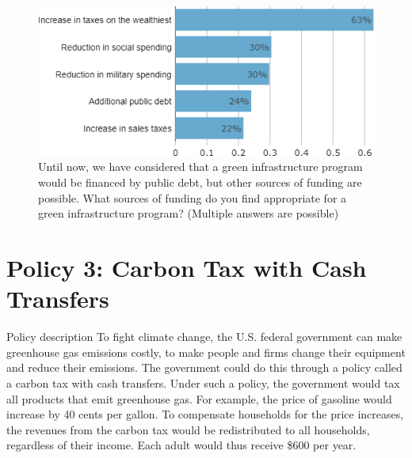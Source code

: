 \documentclass[aspectratio=169,9pt,dvipsnames]{beamer}
\begin{document}
\begin{frame}{}%
\begin{figure}[h!]
\centering
\caption{Until now, we have considered that a green infrastructure program would be financed by public debt, but other sources of funding are possible.
What sources of funding do you find appropriate for a green infrastructure program? (Multiple answers are possible)}
\includegraphics[width=.8\textwidth]{../figures/US/investments_funding_US.png}
\end{figure}
\end{frame}

\section{Policy 3: Carbon Tax with Cash Transfers}

\begin{frame}{Policy description}%
To fight climate change, the U.S. federal government can make greenhouse gas emissions costly, to make people and firms change their equipment and reduce their emissions. The government could do this through a policy called a carbon tax with cash transfers. Under such a policy, the government would tax all products that emit greenhouse gas. For example, the price of gasoline would increase by 40 cents per gallon. To compensate households for the price increases, the revenues from the carbon tax would be redistributed to all households, regardless of their income. Each adult would thus receive \$600 per year.
\end{frame}
\end{document}
